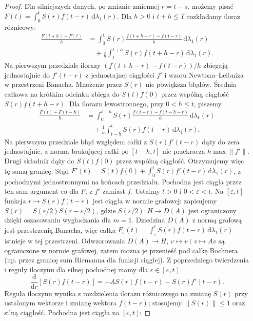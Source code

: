 \begin{proof}
Dla silniejszych danych, po zmianie zmiennej $r=t-s$,
możemy pisać $F(t)=\int_0^tS(r)f(t-r)\,\mathrm d\lambda_1(r)$.
Dla $h>0$ i $t+h\le T$ rozkładamy iloraz różnicowy:
\[
 \begin{aligned}
 \frac{F(t+h)-F(t)}h
 &=\int_0^t S(r)\frac{f(t+h-r)-f(t-r)}h
 \,\mathrm d\lambda_1(r)\\
 &\quad+\frac1h\int_t^{t+h}S(r)f(t+h-r)
 \,\mathrm d\lambda_1(r).
 \end{aligned}
\]
Na pierwszym przedziale ilorazy
$(f(t+h-r)-f(t-r))/h$ zbiegają jednostajnie
do $f'(t-r)$ z jednostajnej ciągłości $f'$ i wzoru
Newtona--Leibniza w przestrzeni Banacha.
Mnożenie przez $S(r)$ nie powiększa błędów.
Średnia całkowa na krótkim odcinku zbiega do $S(t)f(0)$
przez wspólną ciągłość $S(r)f(t+h-r)$.
Dla ilorazu lewostronnego, przy $0<h\le t$, piszemy
\[
 \begin{aligned}
 \frac{F(t)-F(t-h)}h
 &=\int_0^{t-h} S(r)\frac{f(t-r)-f(t-h-r)}h
 \,\mathrm d\lambda_1(r)\\
 &\quad+\frac1h\int_{t-h}^tS(r)f(t-r)
 \,\mathrm d\lambda_1(r).
 \end{aligned}
\]
Na pierwszym przedziale błąd względem całki z $S(r)f'(t-r)$
dąży do zera jednostajnie, a norma brakującej całki po
$[t-h,t]$ nie przekracza $h\max\|f'\|$. Drugi składnik
dąży do $S(t)f(0)$ przez wspólną ciągłość. Otrzymujemy
więc tę samą granicę.
Stąd
$F'(t)=S(t)f(0)+\int_0^tS(r)f'(t-r)\,\mathrm d\lambda_1(r)$,
z pochodnymi jednostronnymi na końcach przedziału.
Pochodna jest ciągła przez ten sam argument co dla $F$,
z $f'$ zamiast $f$.
Ustalmy $t>0$ i $0<\varepsilon<t$.
Na $[\varepsilon,t]$ funkcja $r\mapsto S(r)f(t-r)$
jest ciągła w normie grafowej: zapisujemy
$S(r)=S(\varepsilon/2)S(r-\varepsilon/2)$, gdzie
$S(\varepsilon/2):H\to D(A)$ jest ograniczony dzięki
oszacowaniu wygładzania dla $m=1$. Dziedzina $D(A)$
z normą grafową jest przestrzenią Banacha, więc całka
$F_\varepsilon(t)=\int_\varepsilon^t S(r)f(t-r)\,
\mathrm d\lambda_1(r)$ istnieje w tej przestrzeni.
Odwzorowania $D(A)\to H$, $v\mapsto v$ i $v\mapsto Av$
są ograniczone w normie grafowej, zatem można je
przenieść pod całkę Bochnera (np. przez granicę sum
Riemanna dla funkcji ciągłej).
Z poprzedniego twierdzenia i reguły iloczynu dla
silnej pochodnej mamy dla $r\in[\varepsilon,t]$
\[
 \frac{\mathrm d}{\mathrm dr}[S(r)f(t-r)]
 =-AS(r)f(t-r)-S(r)f'(t-r).
\]
Reguła iloczynu wynika z rozdzielenia ilorazu różnicowego
na zmianę $S(r)$ przy ustalonym wektorze i zmianę
wektora $f(t-r)$; stosujemy $\|S(r)\|\le1$ oraz silną
ciągłość. Pochodna jest ciągła na $[\varepsilon,t]$:

\end{proof}
